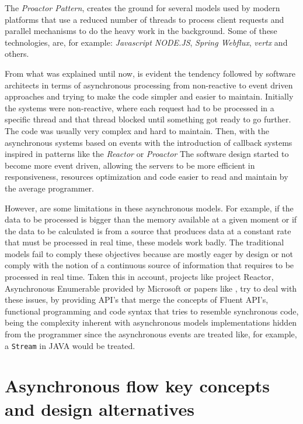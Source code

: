 The \textit{Proactor Pattern}, creates the ground for several models used by modern platforms that use a reduced number of threads to process client requests and parallel mechanisms to do the heavy work in the background. Some of these technologies, are, for example: \textit{Javascript NODE.JS}, \textit{Spring Webflux}, \textit{vertx} and others.

From what was explained until now, is evident the tendency followed by software architects in terms of asynchronous processing from non-reactive to event driven approaches and trying to make the code simpler and easier to maintain. Initially the systems were non-reactive, where each request had to be processed in a 
specific thread and that thread blocked until something got ready to go further. The code was usually very complex and hard to maintain. 
Then, with the asynchronous systems based on events with the introduction of callback systems inspired in patterns like the \textit{Reactor} or \textit{Proactor} The software design started to become more event driven, allowing the servers to be more efficient in responsiveness, resources optimization and code easier to read and maintain by the average programmer.

However, are some limitations in these asynchronous models. For example, if the data to be processed is bigger than the memory available at a given moment or if the data to be calculated is from a source that produces data at a constant rate that must be processed in real time, these models work badly.  
The traditional models fail to comply these objectives because are mostly eager by design or not comply with the notion of a continuous source of information that requires to be processed in real time.
Taken this in account, projects like project Reactor, Asynchronous Enumerable provided by Microsoft or papers like \cite{LAZYVSEAGER}, try to deal with these issues, by providing API's that merge the concepts of Fluent API's, functional programming and code syntax that tries to resemble synchronous code, being the complexity inherent with asynchronous models implementations hidden from the programmer since the asynchronous events are treated like, for example, a \texttt{Stream} in JAVA would be treated.

\clearpage



\section{Asynchronous flow key concepts and design alternatives} %
\label{sec:async_concepts}



